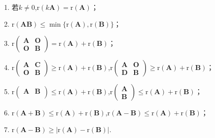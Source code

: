 \documentclass[lang=cn,newtx,10pt,scheme=chinese]{elegantbook}
\begin{document}
\begin{proposition}[矩阵秩的基本公式]\label{proposition:矩阵秩的基本公式}
\begin{enumerate}[(1)]
    \item \label{矩阵秩的基本公式1}若\(k\neq0\),\(\mathrm{r}(k\boldsymbol{A})=\mathrm{r}(\boldsymbol{A})\)；
    
    \item \label{矩阵秩的基本公式2}\(\mathrm{r}(\boldsymbol{A}\boldsymbol{B})\leq\min\{\mathrm{r}(\boldsymbol{A}),\mathrm{r}(\boldsymbol{B})\}\)；
    
    \item \label{矩阵秩的基本公式3}\(\mathrm{r}\begin{pmatrix}\boldsymbol{A}&\boldsymbol{O}\\\boldsymbol{O}&\boldsymbol{B}\end{pmatrix}=\mathrm{r}(\boldsymbol{A})+\mathrm{r}(\boldsymbol{B})\)；
    
    \item \label{矩阵秩的基本公式4}\(\mathrm{r}\begin{pmatrix}\boldsymbol{A}&\boldsymbol{C}\\\boldsymbol{O}&\boldsymbol{B}\end{pmatrix}\geq\mathrm{r}(\boldsymbol{A})+\mathrm{r}(\boldsymbol{B})\),\(\mathrm{r}\begin{pmatrix}\boldsymbol{A}&\boldsymbol{O}\\\boldsymbol{D}&\boldsymbol{B}\end{pmatrix}\geq\mathrm{r}(\boldsymbol{A})+\mathrm{r}(\boldsymbol{B})\)；
    
    \item \label{矩阵秩的基本公式5}\(\mathrm{r}\left( \begin{matrix}
        \boldsymbol{A}&		\boldsymbol{B}\\
    \end{matrix} \right) \leq\mathrm{r}(\boldsymbol{A})+\mathrm{r}(\boldsymbol{B})\),\(\mathrm{r}\begin{pmatrix}\boldsymbol{A}\\\boldsymbol{B}\end{pmatrix}\leq\mathrm{r}(\boldsymbol{A})+\mathrm{r}(\boldsymbol{B})\)；
    
    \item \label{矩阵秩的基本公式6}\(\mathrm{r}(\boldsymbol{A}+\boldsymbol{B})\leq\mathrm{r}(\boldsymbol{A})+\mathrm{r}(\boldsymbol{B})\),\(\mathrm{r}(\boldsymbol{A}-\boldsymbol{B})\leq\mathrm{r}(\boldsymbol{A})+\mathrm{r}(\boldsymbol{B})\)；
    
    \item \label{矩阵秩的基本公式7}\(\mathrm{r}(\boldsymbol{A}-\boldsymbol{B})\geq|\mathrm{r}(\boldsymbol{A})-\mathrm{r}(\boldsymbol{B})|\).
\end{enumerate}
\end{proposition}
\end{document}
